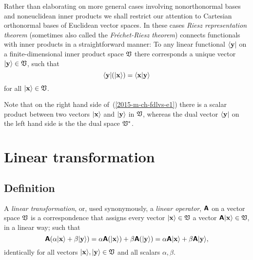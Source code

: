 Rather than elaborating on more general cases involving nonorthonormal bases and noneuclidean inner products we shall
restrict our attention to Cartesian orthonormal bases of Euclidean vector spaces.
In these cases
{\em Riesz representation theorem}
(sometimes also called the {\em Fr\'echet-Riesz theorem})
connects   functionals
with inner products in a straightforward manner:
To any linear functional $\langle {\bf y} \vert$
on a finite-dimensional inner product space ${\frak V}$
there corresponds a unique vector   $ \vert {\bf y} \rangle \in {\frak V}$,
such that
\begin{equation}
\langle {\bf y} \vert (\vert {\bf x} \rangle ) = \langle {\bf x}\vert {\bf y}\rangle
\label{2015-m-ch-fdlvs-e1}
\end{equation}
for all $\vert {\bf x} \rangle\in {\frak V}$.

Note that on the right hand side of~(\ref{2015-m-ch-fdlvs-e1})
there is a scalar product between two vectors $ \vert {\bf x}\rangle $ and $\vert {\bf y} \rangle$ in  ${\frak V}$,
whereas the dual vector $\langle {\bf y} \vert$ on the left hand side is the the dual space ${\frak V}^\ast$.




\section{Linear transformation}

\subsection{Definition}
A {\em linear transformation}, or, used synonymously, a {\em linear operator},
$\textsf{\textbf{A}} $ on a vector space ${\frak V}$ is a correspondence that assigns every vector
$\vert {\bf x} \rangle \in {\frak V}$ a vector $\textsf{\textbf{A}}\vert {\bf x} \rangle \in {\frak V}$,
in a linear way; such  that
\begin{equation}
\textsf{\textbf{A}}  (\alpha\vert {\bf x} \rangle + \beta \vert {\bf y} \rangle ) = \alpha \textsf{\textbf{A}}(\vert {\bf x} \rangle )
+  \beta \textsf{\textbf{A}} (\vert {\bf y} \rangle ) = \alpha \textsf{\textbf{A}}\vert {\bf x} \rangle
+  \beta \textsf{\textbf{A}} \vert {\bf y} \rangle ,
\end{equation}
identically for all vectors $\vert {\bf x} \rangle ,\vert {\bf y} \rangle \in {\frak V}$ and all scalars $\alpha , \beta$.


